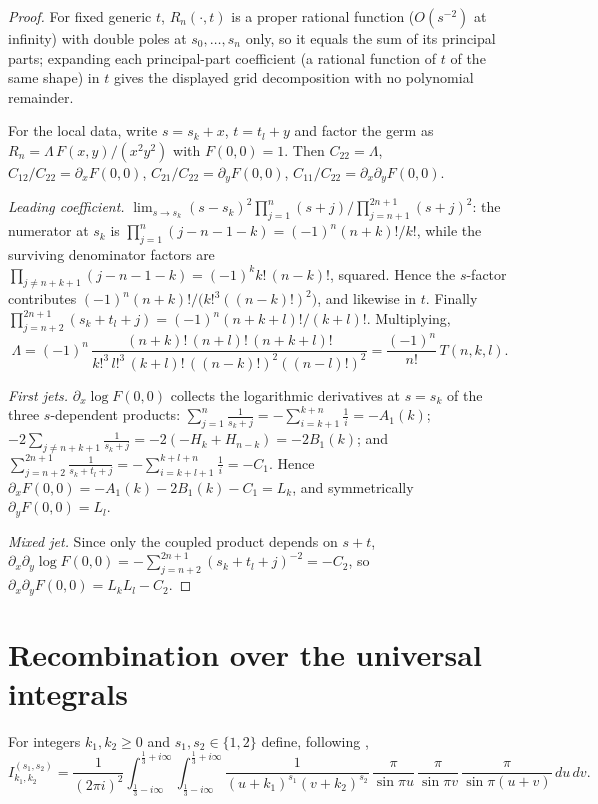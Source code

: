 \documentclass[11pt]{article}
\theoremstyle{remark}
\begin{document}
\begin{proof}
For fixed generic $t$, $R_n(\cdot,t)$ is a proper rational function
($O(s^{-2})$ at infinity) with double poles at $s_0,\dots,s_n$ only, so it
equals the sum of its principal parts; expanding each principal-part
coefficient (a rational function of $t$ of the same shape) in $t$ gives the
displayed grid decomposition with no polynomial remainder.

For the local data, write $s=s_k+x$, $t=t_l+y$ and factor the germ as
$R_n=\Lambda\,F(x,y)/(x^2y^2)$ with $F(0,0)=1$.  Then
$C_{22}=\Lambda$, $C_{12}/C_{22}=\partial_xF(0,0)$,
$C_{21}/C_{22}=\partial_yF(0,0)$,
$C_{11}/C_{22}=\partial_x\partial_yF(0,0)$.

\emph{Leading coefficient.}
$\lim_{s\to s_k}(s-s_k)^2\prod_{j=1}^n(s+j)\big/\prod_{j=n+1}^{2n+1}(s+j)^2$:
the numerator at $s_k$ is $\prod_{j=1}^n(j-n-1-k)=(-1)^n(n+k)!/k!$, while
the surviving denominator factors are
$\prod_{j\ne n+k+1}(j-n-1-k)=(-1)^kk!\,(n-k)!$, squared.  Hence the $s$-factor
contributes $(-1)^n(n+k)!/\bigl(k!^3((n-k)!)^2\bigr)$, and likewise in $t$.
Finally $\prod_{j=n+2}^{2n+1}(s_k+t_l+j)=(-1)^n(n+k+l)!/(k+l)!$.  Multiplying,
\[
 \Lambda=(-1)^n\,
 \frac{(n+k)!\,(n+l)!\,(n+k+l)!}{k!^3\,l!^3\,(k+l)!\,((n-k)!)^2((n-l)!)^2}
 =\frac{(-1)^n}{n!}\,T(n,k,l).
\]

\emph{First jets.}  $\partial_x\log F(0,0)$ collects the logarithmic
derivatives at $s=s_k$ of the three $s$-dependent products:
$\sum_{j=1}^n\frac1{s_k+j}=-\sum_{i=k+1}^{k+n}\frac1i=-A_1(k)$;
$-2\sum_{j\ne n+k+1}\frac1{s_k+j}=-2(-H_k+H_{n-k})=-2B_1(k)$;
and $\sum_{j=n+2}^{2n+1}\frac1{s_k+t_l+j}=-\sum_{i=k+l+1}^{k+l+n}\frac1i=-C_1$.
Hence $\partial_xF(0,0)=-A_1(k)-2B_1(k)-C_1=L_k$, and symmetrically
$\partial_yF(0,0)=L_l$.

\emph{Mixed jet.}  Since only the coupled product depends on $s+t$,
$\partial_x\partial_y\log F(0,0)
=-\sum_{j=n+2}^{2n+1}(s_k+t_l+j)^{-2}=-C_2$, so
$\partial_x\partial_yF(0,0)=L_kL_l-C_2$.
\end{proof}

\section{Recombination over the universal integrals}\label{sec:recomb}

For integers $k_1,k_2\ge0$ and $s_1,s_2\in\{1,2\}$ define, following
\cite[Remark~1]{BZ},
\begin{equation}\label{eq:universal}
 I^{(s_1,s_2)}_{k_1,k_2}
 =\frac1{(2\pi i)^2}
 \int_{\frac13-i\infty}^{\frac13+i\infty}\!\!\int_{\frac13-i\infty}^{\frac13+i\infty}
 \frac{1}{(u+k_1)^{s_1}(v+k_2)^{s_2}}\,
 \frac{\pi}{\sin\pi u}\,\frac{\pi}{\sin\pi v}\,\frac{\pi}{\sin\pi(u+v)}
 \,du\,dv .
\end{equation}
\end{document}

